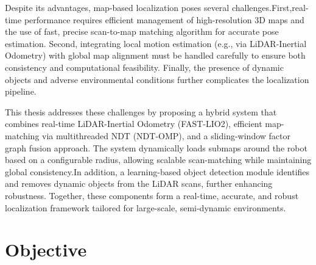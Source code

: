 Despite its advantages, map-based localization poses several challenges.First,real-time performance requires efficient management of high-resolution 3D maps and the use of fast, precise scan-to-map matching algorithm for accurate pose estimation. Second, integrating local motion estimation (e.g., via LiDAR-Inertial Odometry) with global map alignment must be handled carefully to ensure both consistency and computational feasibility. Finally, the presence of dynamic objects and adverse environmental conditions further complicates the localization pipeline.

This thesis addresses these challenges by proposing a hybrid system that combines real-time LiDAR-Inertial Odometry (FAST-LIO2), efficient map-matching via multithreaded NDT (NDT-OMP), and a sliding-window factor graph fusion approach. The system dynamically loads submaps around the robot based on a configurable radius, allowing scalable scan-matching while maintaining global consistency.In addition, a learning-based object detection module identifies and removes dynamic objects from the LiDAR scans, further enhancing robustness. Together, these components form a real-time, accurate, and robust localization framework tailored for large-scale, semi-dynamic environments.

\section{Objective}

